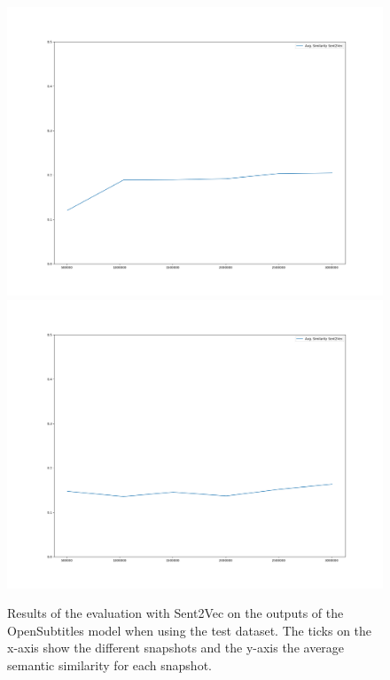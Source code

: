 \begin{figure}[H]
	\includegraphics[width=\linewidth]{img/plots/opensubtitles_not_reversed/s2v_wiki_cosine_similarity.png}
	\centering
	\small
	\endminipage\hfill
	\includegraphics[width=\linewidth]{img/plots/opensubtitles_not_reversed/s2v_twitter_cosine_similarity.png}
	\centering
	\small
	\endminipage\hfill
	\caption{Results of the evaluation with Sent2Vec on the outputs of the OpenSubtitles model when using the test dataset. The ticks on the x-axis show the different snapshots and the y-axis the average semantic similarity for each snapshot.}
	\label{results:sent2vec:opensubtitles:results}
\end{figure}

